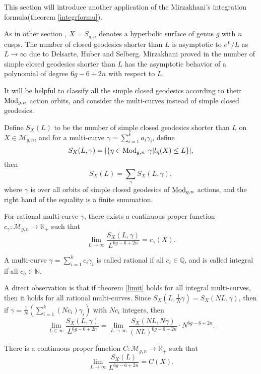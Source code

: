 This section will introduce another application of the Mirzakhani's integration formula(theorem \ref{integrformu}).

As in other section , $X=S_{g,n}$ denotes a hyperbolic surface of genus $g$ with $n$ cusps. The number of closed geodesics shorter than $L$  is asymptotic to $e^L/L$ as $L\to \infty$ due to Delsarte, Huber and Selberg\cite{Buser}. Mirzakhani proved in \cite{growthofsimple} the number of simple closed geodesics shorter than $L$ has the asymptotic behavior of a polynomial of degree  $6g-6+2n$ with respect to $L$.

It will be helpful to classify all the simple closed geodesics according to their $\operatorname{Mod}_{g,n}$ action orbits, and consider the multi-curves instead of  simple closed geodesics.

Define $S_X(L)$ to be the number of simple closed geodesics shorter than $L$ on $X\in \mathscr{M}_{g,n}$, and for a multi-curve $\gamma=\sum_{i=1}^ka_i\gamma_i$, define $$
S_X(L,\gamma)=|\{\eta\in \operatorname{Mod}_{g,n}\cdot \gamma|l_\eta(X)\leq L\}|,
$$
then $$
S_X(L)=\sum_\gamma S_X(L,\gamma),
$$
where $\gamma$ is over all orbits of simple closed geodesics of $\operatorname{Mod}_{g,n}$ actions, and the right hand of the  equality is  a finite summation.

 \begin{theorem}\label{limit}
 For rational multi-curve $\gamma$, there exists a continuous proper function $c_\gamma:\mathscr{M}_{g,n}\to \mathbb{R}_+$ such that 
\begin{equation}
    \lim_{L\to \infty}\frac{S_X(L,\gamma)}{L^{6g-6+2n}}=c_\gamma(X).
\end{equation}
 \end{theorem}
 
 A multi-curve $\gamma=\sum_{i=1}^kc_i\gamma_i$ is called rational if all $c_i\in \mathbb{Q}$, and is called integral if all $c_o\in \mathbb{N}$.
 
 A direct observation is that if theorem \ref{limit} holds for all integral multi-curves, then it holds for all rational multi-curves. Since $S_{X}(L,\frac{1}{N}\gamma)=S_X(NL,\gamma)$, then if $\gamma=\frac{1}{N}(\sum_{i=1}^k(Nc_i)\gamma_i)$ with $Nc_i$ integers, then $$
 \lim_{L\in\infty}\frac{S_X(L,\gamma)}{L^{6g-6+2n}}=\lim_{L\to\infty}\frac{S_{X}(NL,N\gamma)}{(NL)^{6g-6+2n}}\cdot N^{6g-6+2n}.
 $$
  
 \begin{corollary}
 There is a continuous proper function $C:\mathscr{M}_{g,n}\to \mathbb{R}_+$ such that \begin{equation}
    \lim_{L\to \infty}\frac{S_X(L)}{L^{6g-6+2n}}=C(X).
\end{equation}
 \end{corollary}
 
